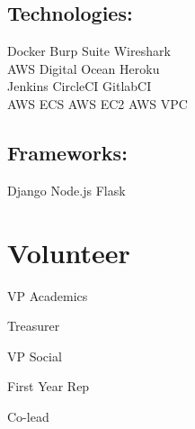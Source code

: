 \documentclass[]{deedy-resume-openfont}
\begin{document}
\begin{minipage}[t]{0.33\textwidth}
\sectionsep
\subsection{Technologies:}
\sectionsep

Docker \textbullet{} Burp Suite \textbullet{} Wireshark\\

AWS \textbullet{} Digital Ocean \textbullet{} Heroku\\

Jenkins \textbullet{} CircleCI \textbullet{} GitlabCI\\

AWS ECS \textbullet{} AWS EC2 \textbullet{} AWS VPC\\

\sectionsep
\subsection{Frameworks:}
\sectionsep

Django \textbullet{} Node.js \textbullet{} Flask \\

\sectionsep

\section{Volunteer}

\begin{tightemize}

\item VP Academics

\item Treasurer

\item VP Social

\item First Year Rep

\end{tightemize}
\begin{tightemize}

\item Co-lead

\end{tightemize}
\begin{tightemize}


\end{tightemize}
\end{minipage}
\end{document}
